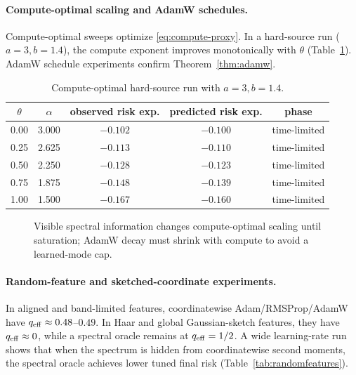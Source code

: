 \documentclass{article}
\begin{document}
\paragraph{Compute-optimal scaling and AdamW schedules.} Compute-optimal sweeps optimize \eqref{eq:compute-proxy}.  In a hard-source run ($a=3,b=1.4$), the compute exponent improves monotonically with $\theta$ (Table~\ref{tab:compute}).  AdamW schedule experiments confirm Theorem~\ref{thm:adamw}.

\begin{table}[t]
\centering
\caption{Compute-optimal hard-source run with $a=3,b=1.4$.}
\label{tab:compute}
\begin{tabular}{ccccc}
\toprule
$\theta$ & $\alpha$ & observed risk exp. & predicted risk exp. & phase \\
\midrule
0.00 & 3.000 & $-0.102$ & $-0.100$ & time-limited \\
0.25 & 2.625 & $-0.113$ & $-0.110$ & time-limited \\
0.50 & 2.250 & $-0.128$ & $-0.123$ & time-limited \\
0.75 & 1.875 & $-0.148$ & $-0.139$ & time-limited \\
1.00 & 1.500 & $-0.167$ & $-0.160$ & time-limited \\
\bottomrule
\end{tabular}
\end{table}

\begin{figure}[t]
\centering
{}
\caption{Visible spectral information changes compute-optimal scaling until saturation; AdamW decay must shrink with compute to avoid a learned-mode cap.}
\label{fig:compute}
\end{figure}

\paragraph{Random-feature and sketched-coordinate experiments.} In aligned and band-limited features, coordinatewise Adam/RMSProp/AdamW have $q_{\rm eff}\approx0.48$--$0.49$.  In Haar and global Gaussian-sketch features, they have $q_{\rm eff}\approx0$, while a spectral oracle remains at $q_{\rm eff}=1/2$.  A wide learning-rate run shows that when the spectrum is hidden from coordinatewise second moments, the spectral oracle achieves lower tuned final risk (Table~\ref{tab:randomfeatures}).
\end{document}
